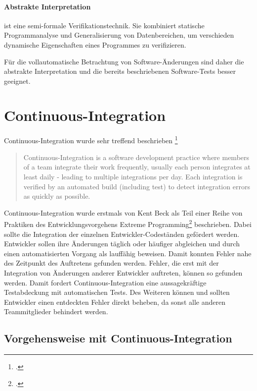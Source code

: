\paragraph{Abstrakte Interpretation} ist eine semi-formale Verifikationstechnik. Sie kombiniert statische Programmanalyse und Generalisierung von Datenbereichen, um verschieden dynamische Eigenschaften eines Programmes zu verifizieren.

\vspace{1em}

Für die vollautomatische Betrachtung von Software-Änderungen sind daher die abstrakte Interpretation und die bereits beschriebenen Software-Tests besser geeignet. 

\section{Continuous-Integration}

Continuous-Integration wurde sehr treffend beschrieben \footcite[vgl.][]{fowler2006}

\blockquote {Continuous-Integration is a software development practice where members of a team integrate their work frequently, usually each person integrates at least daily - leading to multiple integrations per day. Each integration is verified by an automated build (including test) to detect integration errors as quickly as possible.}

Continuous-Integration wurde erstmals von Kent Beck als Teil einer Reihe von Praktiken des Entwicklungsvorgehens \glqq Extreme Programming\grqq{}\footcite[vgl.][]{kent1999} beschrieben. Dabei sollte die Integration der einzelnen Entwickler-Codeständen gefördert werden. Entwickler sollen ihre Änderungen täglich oder häufiger abgleichen und durch einen automatisierten Vorgang als lauffähig beweisen. Damit konnten Fehler nahe des Zeitpunkt des Auftretens gefunden werden. Fehler, die erst mit der Integration von Änderungen anderer Entwickler auftreten, können so gefunden werden. Damit fordert Continuous-Integration eine aussagekräftige Testabdeckung mit automatischen Tests. Des Weiteren können und sollten Entwickler einen entdeckten Fehler direkt beheben, da sonst alle anderen Teammitglieder behindert werden.

\subsection{Vorgehensweise mit Continuous-Integration}

